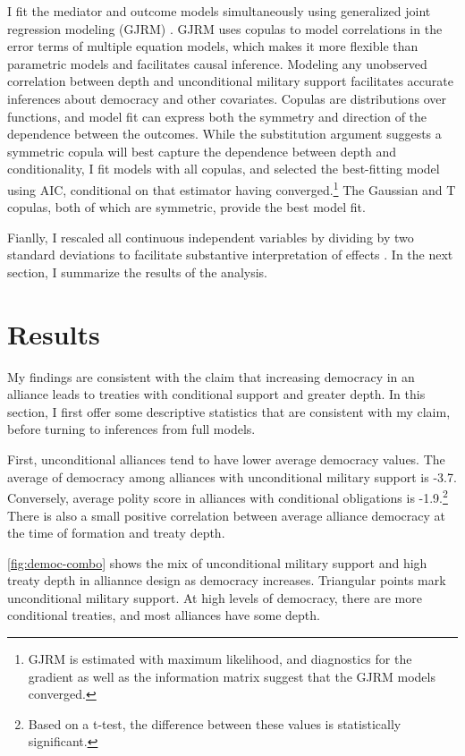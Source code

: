 \documentclass[12pt]{article}
\begin{document}
I fit the mediator and outcome models simultaneously using generalized joint regression modeling (GJRM) \citep{Braumoelleretal2018}.
GJRM uses copulas to model correlations in the error terms of multiple equation models, which makes it more flexible than parametric models and facilitates causal inference. 
Modeling any unobserved correlation between depth and unconditional military support facilitates accurate inferences about democracy and other covariates. 
Copulas are distributions over functions, and model fit can express both the symmetry and direction of the dependence between the outcomes. 
While the substitution argument suggests a symmetric copula will best capture the dependence between depth and conditionality, I fit models with all copulas, and selected the best-fitting model using AIC, conditional on that estimator having converged.\footnote{GJRM is estimated with maximum likelihood, and diagnostics for the gradient as well as the information matrix suggest that the GJRM models converged.} 
The Gaussian and T copulas, both of which are symmetric, provide the best model fit. 


Fianlly, I rescaled all continuous independent variables by dividing by two standard deviations to facilitate substantive interpretation of effects \citep{Gelman2008}. 
In the next section, I summarize the results of the analysis. 



\section{Results}


My findings are consistent with the claim that increasing democracy in an alliance leads to treaties with conditional support and greater depth. 
In this section, I first offer some descriptive statistics that are consistent with my claim, before turning to inferences from full models. 


First, unconditional alliances tend to have lower average democracy values. 
The average of democracy among alliances with unconditional military support is -3.7. 
Conversely, average polity score in alliances with conditional obligations is -1.9.\footnote{Based on a t-test, the difference between these values is statistically significant.} 
There is also a small positive correlation between average alliance democracy at the time of formation and treaty depth. 

\autoref{fig:democ-combo} shows the mix of unconditional military support and high treaty depth in alliannce design as democracy increases. 
Triangular points mark unconditional military support. 
At high levels of democracy, there are more conditional treaties, and most alliances have some depth. 
\end{document}
